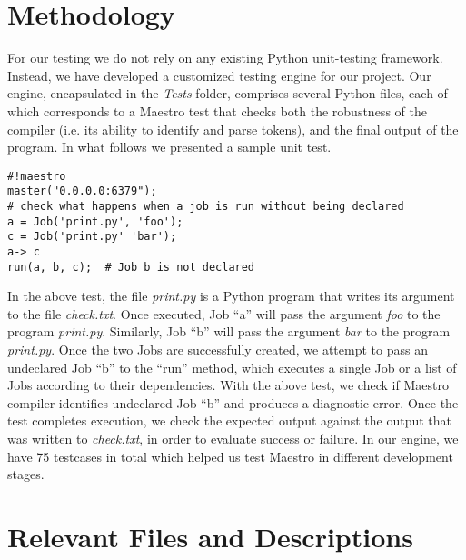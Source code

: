 \section{Methodology}
For our testing we do not rely on any existing Python unit-testing framework.
Instead, we have developed a customized testing engine for our project.
Our engine, encapsulated in the \textit{Tests} folder, comprises several Python
files, each of which corresponds to a Maestro test that checks both the
robustness of the compiler (i.e. its ability to identify and parse tokens),
and the final output of the program.
In what follows we presented a sample unit test.

\begin{center}
\begin{verbatim}
#!maestro
master("0.0.0.0:6379");
# check what happens when a job is run without being declared
a = Job('print.py', 'foo');
c = Job('print.py' 'bar');
a-> c
run(a, b, c);  # Job b is not declared
\end{verbatim}
\end{center}


In the above test, the file \textit{print.py} is a Python program that writes
its argument to the file \textit{check.txt}. Once executed, Job ``a'' will
pass the argument \textit{foo} to the program \textit{print.py}. Similarly,
Job ``b'' will
pass the argument \textit{bar} to the program \textit{print.py}.
Once the two Jobs are successfully created, we attempt to pass an undeclared
Job ``b'' to the ``run'' method, which executes a single Job or a list of Jobs
according to their dependencies. With the above test, we check if
Maestro compiler identifies undeclared Job ``b'' and produces a diagnostic
error. Once the test completes execution, we check the expected output against
the output that was written to \textit{check.txt}, in order to evaluate success
or failure. In our engine, we have 75 testcases in total which helped us test
Maestro in different development stages.

\section{Relevant Files and Descriptions}

